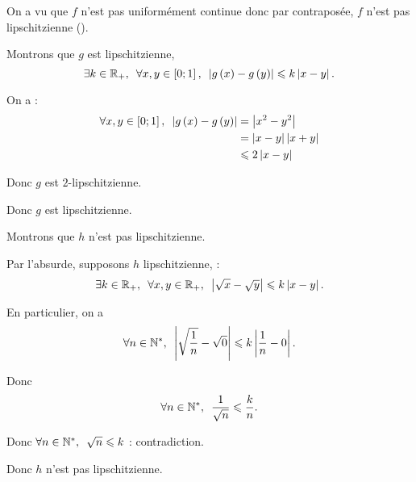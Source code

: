 \begin{corr}[\(f\)]
On a vu que \(f\) n'est pas uniformément continue donc par contraposée, \(f\) n'est pas lipschitzienne (\cf {}).
\end{corr}

\begin{corr}[\(g\)]
Montrons que \(g\) est lipschitzienne, \cad \[\quantifs{\exists k\in\Rp;\forall x,y\in\intervii{0}{1}}\abs{g\paren{x}-g\paren{y}}\leq k\abs{x-y}.\]

On a : \[\begin{aligned}
\quantifs{\forall x,y\in\intervii{0}{1}}\abs{g\paren{x}-g\paren{y}}&=\abs{x^2-y^2} \\
&=\abs{x-y}\abs{x+y} \\
&\leq2\abs{x-y}
\end{aligned}\]

Donc \(g\) est \(2\)-lipschitzienne.

Donc \(g\) est lipschitzienne.
\end{corr}

\begin{corr}[\(h\)]
Montrons que \(h\) n'est pas lipschitzienne.

Par l'absurde, supposons \(h\) lipschitzienne, \cad : \[\quantifs{\exists k\in\Rp;\forall x,y\in\Rp}\abs{\sqrt{x}-\sqrt{y}}\leq k\abs{x-y}.\]

En particulier, on a \[\quantifs{\forall n\in\Ns}\abs{\sqrt{\dfrac{1}{n}}-\sqrt{0}}\leq k\abs{\dfrac{1}{n}-0}.\]

Donc \[\quantifs{\forall n\in\Ns}\dfrac{1}{\sqrt{n}}\leq\dfrac{k}{n}.\]

Donc \(\quantifs{\forall n\in\Ns}\sqrt{n}\leq k\) : contradiction.

Donc \(h\) n'est pas lipschitzienne.
\end{corr}